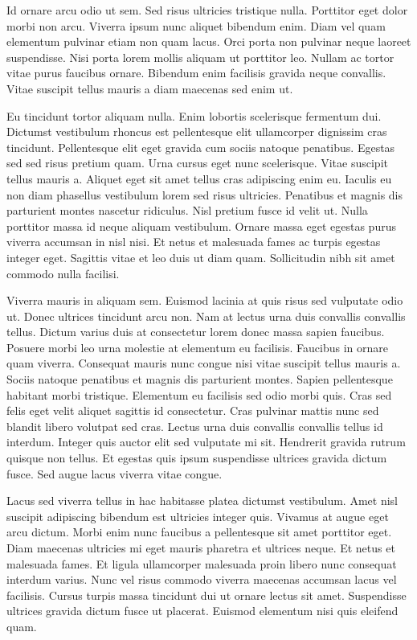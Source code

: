 \documentclass[11pt,a4paper]{article}
\begin{document}
Id ornare arcu odio ut sem. Sed risus ultricies tristique nulla. Porttitor eget dolor morbi non arcu. Viverra ipsum nunc aliquet bibendum enim. Diam vel quam elementum pulvinar etiam non quam lacus. Orci porta non pulvinar neque laoreet suspendisse. Nisi porta lorem mollis aliquam ut porttitor leo. Nullam ac tortor vitae purus faucibus ornare. Bibendum enim facilisis gravida neque convallis. Vitae suscipit tellus mauris a diam maecenas sed enim ut.

Eu tincidunt tortor aliquam nulla. Enim lobortis scelerisque fermentum dui. Dictumst vestibulum rhoncus est pellentesque elit ullamcorper dignissim cras tincidunt. Pellentesque elit eget gravida cum sociis natoque penatibus. Egestas sed sed risus pretium quam. Urna cursus eget nunc scelerisque. Vitae suscipit tellus mauris a. Aliquet eget sit amet tellus cras adipiscing enim eu. Iaculis eu non diam phasellus vestibulum lorem sed risus ultricies. Penatibus et magnis dis parturient montes nascetur ridiculus. Nisl pretium fusce id velit ut. Nulla porttitor massa id neque aliquam vestibulum. Ornare massa eget egestas purus viverra accumsan in nisl nisi. Et netus et malesuada fames ac turpis egestas integer eget. Sagittis vitae et leo duis ut diam quam. Sollicitudin nibh sit amet commodo nulla facilisi.

Viverra mauris in aliquam sem. Euismod lacinia at quis risus sed vulputate odio ut. Donec ultrices tincidunt arcu non. Nam at lectus urna duis convallis convallis tellus. Dictum varius duis at consectetur lorem donec massa sapien faucibus. Posuere morbi leo urna molestie at elementum eu facilisis. Faucibus in ornare quam viverra. Consequat mauris nunc congue nisi vitae suscipit tellus mauris a. Sociis natoque penatibus et magnis dis parturient montes. Sapien pellentesque habitant morbi tristique. Elementum eu facilisis sed odio morbi quis. Cras sed felis eget velit aliquet sagittis id consectetur. Cras pulvinar mattis nunc sed blandit libero volutpat sed cras. Lectus urna duis convallis convallis tellus id interdum. Integer quis auctor elit sed vulputate mi sit. Hendrerit gravida rutrum quisque non tellus. Et egestas quis ipsum suspendisse ultrices gravida dictum fusce. Sed augue lacus viverra vitae congue.

Lacus sed viverra tellus in hac habitasse platea dictumst vestibulum. Amet nisl suscipit adipiscing bibendum est ultricies integer quis. Vivamus at augue eget arcu dictum. Morbi enim nunc faucibus a pellentesque sit amet porttitor eget. Diam maecenas ultricies mi eget mauris pharetra et ultrices neque. Et netus et malesuada fames. Et ligula ullamcorper malesuada proin libero nunc consequat interdum varius. Nunc vel risus commodo viverra maecenas accumsan lacus vel facilisis. Cursus turpis massa tincidunt dui ut ornare lectus sit amet. Suspendisse ultrices gravida dictum fusce ut placerat. Euismod elementum nisi quis eleifend quam.
\end{document}
